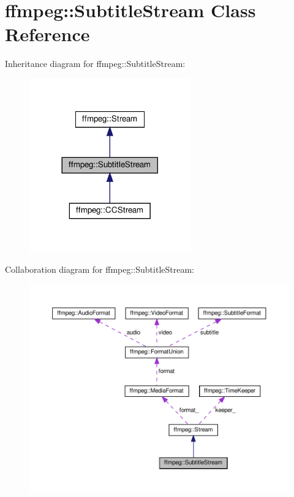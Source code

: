 \hypertarget{classffmpeg_1_1SubtitleStream}{}\section{ffmpeg\+:\+:Subtitle\+Stream Class Reference}
\label{classffmpeg_1_1SubtitleStream}


Inheritance diagram for ffmpeg\+:\+:Subtitle\+Stream\+:
\nopagebreak
\begin{figure}[H]
\begin{center}
\leavevmode
\includegraphics[width=197pt]{classffmpeg_1_1SubtitleStream__inherit__graph}
\end{center}
\end{figure}


Collaboration diagram for ffmpeg\+:\+:Subtitle\+Stream\+:
\nopagebreak
\begin{figure}[H]
\begin{center}
\leavevmode
\includegraphics[width=350pt]{classffmpeg_1_1SubtitleStream__coll__graph}
\end{center}
\end{figure}
